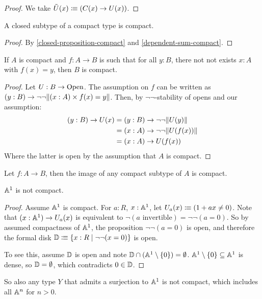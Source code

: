 \begin{proof}
  We take $\tilde{U}(x)\vcentcolon\mspace{-1.2mu}\equiv (C(x)\to U(x))$.
\end{proof}

\begin{lemma}
  \label{closed-subtype-compact}
  A closed subtype of a compact type is compact.
\end{lemma}

\begin{proof}
  By \cref{closed-proposition-compact} and \cref{dependent-sum-compact}.
\end{proof}

\begin{lemma}
  \label{not-not-surjection-compact}
  If $A$ is compact and $f:A\to B$ is such that for all $y:B$,
  there not not exists $x:A$ with $f(x)=y$,
  then $B$ is compact.
\end{lemma}

\begin{proof}
  Let $U:B\to\mathrm{Open}$.
  The assumption on $f$ can be written as $(y:B)\to \neg\neg \lVert  (x:A)\times f(x)=y  \rVert$.
  Then, by $\neg\neg$-stability of opens and our assumption:
  \begin{align*}
    (y:B)\to U(x) &= (y:B)\to \neg\neg \lVert  U(y)  \rVert \\
                  &= (x:A)\to \neg\neg \lVert  U(f(x))  \rVert \\
                  &= (x:A)\to U(f(x))
  \end{align*}
  Where the latter is open by the assumption that $A$ is compact.
\end{proof}

\begin{corollary}
  \label{image-compact}
  Let $f:A\to B$, then the image of any compact subtype of $A$ is compact.
\end{corollary}

\begin{proposition}
  $\mathbb{A}^1$ is not compact.
\end{proposition}

\begin{proof}
  Assume $\mathbb{A}^1$ is compact.
  For $a:R$, $x:\mathbb{A}^1$, let $U_a(x)\vcentcolon\mspace{-1.2mu}\equiv (1+ax \neq 0)$.
  Note that $(x:\mathbb{A}^1)\to U_a(x)$ is equivalent to $\neg(\text{$a$ invertible})=\neg\neg(a=0)$.
  So by assumed compactness of $\mathbb{A}^1$, the proposition $\neg\neg(a=0)$ is open,
  and therefore the formal disk $\mathbb{D}\vcentcolon\mspace{-1.2mu}\equiv \{x:R\mid \neg\neg(x=0)\}$ is open.

  To see this, assume $\mathbb{D}$ is open and note $\mathbb{D}\cap (\mathbb{A}^1\setminus\{0\})=\emptyset$.
  $\mathbb{A}^1\setminus\{0\}\subseteq \mathbb{A}^1$ is dense, so $\mathbb{D}=\emptyset$, which contradicts $0\in\mathbb{D}$.
\end{proof}

So also any type $Y$ that admits a surjection to $\mathbb{A}^1$ is not compact, which includes all $\mathbb{A}^n$ for $n>0$.
